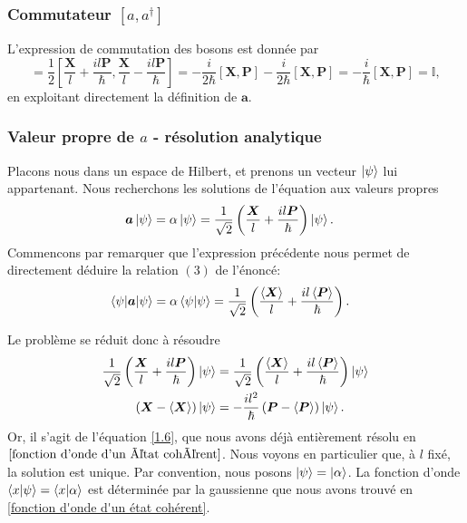 \documentclass[11pt,oneside,a4paper]{article}
\newcommand{\h}{\ensuremath{\hbar}}
\begin{document}
\subsubsection{Commutateur $[a,a^\dagger]$}
L'expression de commutation des bosons est donnée par
\begin{equation}
    [\bm{a},\bm{a}^\dagger] = \frac{1}{2} [\frac{\bm{X}}{l}+\frac{il\bm{P}}{\hbar},\frac{\bm{X}}{l}-\frac{il\bm{P}}{\hbar}] = -\frac{i}{2\h} [\bm{X},\bm{P}]-\frac{i}{2\h}[\bm{X},\bm{P}] = -\frac{i}{\h}[\bm{X},\bm{P}] = \mathbb{I},
\end{equation}
en exploitant directement la définition de $\bm{a}$.

\subsubsection{Valeur propre de $a$ - résolution analytique}
\label{resolution analytique}

Placons nous dans un espace de Hilbert, et prenons un vecteur $\ket{\psi}$ lui appartenant. Nous recherchons les solutions de l'équation aux valeurs propres
\begin{align*}
  \bm{a}\ket{\psi} &= \alpha\ket{\psi} = \frac{1}{\sqrt{2}}\left(\frac{\bm{X}}{l}+\frac{il\bm{P}}{\h}\right)\ket{\psi}.
\end{align*}
Commencons par remarquer que l'expression précédente nous permet de directement déduire la relation $(3)$ de l'énoncé:
\begin{align*}
  \expval{\bm{a}}{\psi} &= \alpha\braket{\psi} = \frac{1}{\sqrt{2}}\left(\frac{\expval{\bm{X}}}{l}+\frac{il\expval{\bm{P}}}{\h}\right).
\end{align*}

Le problème se réduit donc à résoudre
\begin{align*}
  \frac{1}{\sqrt{2}}\left(\frac{\bm{X}}{l}+\frac{il\bm{P}}{\h}\right)\ket{\psi} &= \frac{1}{\sqrt{2}}\left(\frac{\expval{\bm{X}}}{l}+\frac{il\expval{\bm{P}}}{\h}\right)\ket{\psi}\\
  \left(\bm{X}-\expval{\bm{X}}\right)\ket{\psi} &= -\frac{il^2}{\h}\left(\bm{P}-\expval{\bm{P}}\right)\ket{\psi}.
\end{align*}
Or, il s'agit de l'équation \eqref{1.6}, que nous avons déjà entièrement résolu en $\ref{fonction d'onde d'un état cohérent}$. Nous voyons en particulier que, à $l$ fixé, la solution est unique. Par convention, nous posons $\ket{\psi} = \ket{\alpha}$. La fonction d'onde $\braket{x}{\psi}=\braket{x}{\alpha}$ est déterminée par la gaussienne que nous avons trouvé en \ref{fonction d'onde d'un état cohérent}.\\
\end{document}

